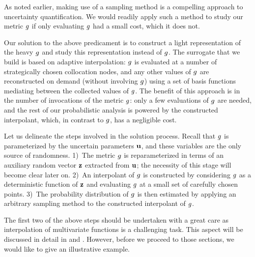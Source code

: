 As noted earlier, making use of a sampling method is a compelling approach to
uncertainty quantification. We would readily apply such a method to study our
metric $g$ if only evaluating $g$ had a small cost, which it does not.

Our solution to the above predicament is to construct a light representation of
the heavy $g$ and study this representation instead of $g$. The surrogate that
we build is based on adaptive interpolation: $g$ is evaluated at a number of
strategically chosen collocation nodes, and any other values of $g$ are
reconstructed on demand (without involving $g$) using a set of basis functions
mediating between the collected values of $g$. The benefit of this approach is
in the number of invocations of the metric $g$: only a few evaluations of $g$
are needed, and the rest of our probabilistic analysis is powered by the
constructed interpolant, which, in contrast to $g$, has a negligible cost.

Let us delineate the steps involved in the solution process. Recall that $g$ is
parameterized by the uncertain parameters $\mathbf{u}$, and these variables are the
only source of randomness. 1)~The metric $g$ is reparameterized in terms of an
auxiliary random vector $\mathbf{z}$ extracted from $\mathbf{u}$; the necessity of this stage
will become clear later on. 2)~An interpolant of $g$ is constructed by
considering $g$ as a deterministic function of $\mathbf{z}$ and evaluating $g$ at a
small set of carefully chosen points. 3)~The probability distribution of $g$ is
then estimated by applying an arbitrary sampling method to the constructed
interpolant of $g$.

The first two of the above steps should be undertaken with a great care as
interpolation of multivariate functions is a challenging task. This aspect will
be discussed in detail in  and . However,
before we proceed to those sections, we would like to give an illustrative
example.
